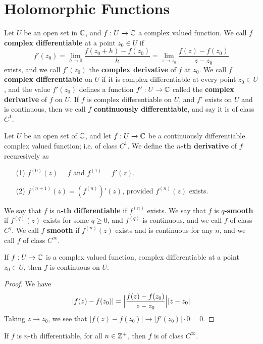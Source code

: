 \section{Holomorphic Functions}

\begin{definition}
    Let $U$ be an open set in  $\mathbb{C}$, and  $f:U \xrightarrow{} \mathbb{C}$ a complex
    valued function. We call $f$  \textbf{complex differentiable} at a point
    $z_0 \in U$ if
    \begin{equation*}
        f'(z_0)=\lim_{h \xrightarrow{} 0}{\frac{f(z_0+h)-f(z_0)}{h}}=
        \lim_{z \xrightarrow{} z_0}{\frac{f(z)-f(z_0)}{z-z_0}}
    \end{equation*}
    exists, and we call $f'(z_0)$ the \textbf{complex derivative} of $f$ at
    $z_0$. We call $f$  \textbf{complex differentiable} on $U$ if it is complex
    differentiable at every point  $z_0 \in U$, and the value $f'(z_0)$ defines
    a function $f':U \xrightarrow{} \mathbb{C}$ called the \textbf{complex derivative}
    of $f$ on  $U$. If  $f$ is complex differentiable on $U$, and  $f'$ exists
    on $U$ and is continuous, then we call $f$ \textbf{continuously
    differentiable}, and say it is of class $C^1$.
\end{definition}

\begin{definition}
    Let $U$ be an open set of $\mathbb{C}$, and let $f:U \xrightarrow{} \mathbb{C}$ be a
    continuously differentiable complex valued function; i.e. of class $C^1$. We
    define the \textbf{$n$-th derivative} of $f$ recuresively as
    \begin{enumerate}
        \item[(1)] $f^{(0)}(z)=f$ and $f^{(1)}=f'(z)$.

        \item[(2)] $f^{(n+1)}(z)=(f^{(n)})'(z)$, provided $f^{(n)}(z)$ exists.
    \end{enumerate}
    We say that $f$ is \textbf{$n$-th differentiable} if $f^{(n)}$ exists. We
    say that $f$ is \textbf{$q$-smooth} if $f^{(q)}(z)$ exists for some $q \geq
    0$, and  $f^{(q)}$ is continuous, and we call $f$ of class $C^q$. We call
    $f$  \textbf{smooth} if $f^{(n)}(z)$ exists and is continuous for any $n$,
    and we call  $f$ of class  $C^\infty$.
\end{definition}

\begin{lemma}\label{3.2.1}
    If $f:U \xrightarrow{} \mathbb{C}$ is a complex valued function, complex
    differentiable at a point $z_0 \in U$, then $f$ is continuous on  $U$.
\end{lemma}
\begin{proof}
    We have
    \begin{equation*}
        |f(z)-f(z_0)|=\Big{|} \frac{f(z)-f(z_0)}{z-z_0} \Big{|}|z-z_0|
    \end{equation*}
    Taking $z \xrightarrow{} z_0$, we see that $|f(z)-f(z_0)| \xrightarrow{}
    |f'(z_0)| \cdot 0=0$.
\end{proof}
\begin{corollary}
    If $f$ is $n$-th differentiable, for all $n \in \mathbb{Z}^+$, then $f$ is of class
    $C^\infty$.
\end{corollary}

